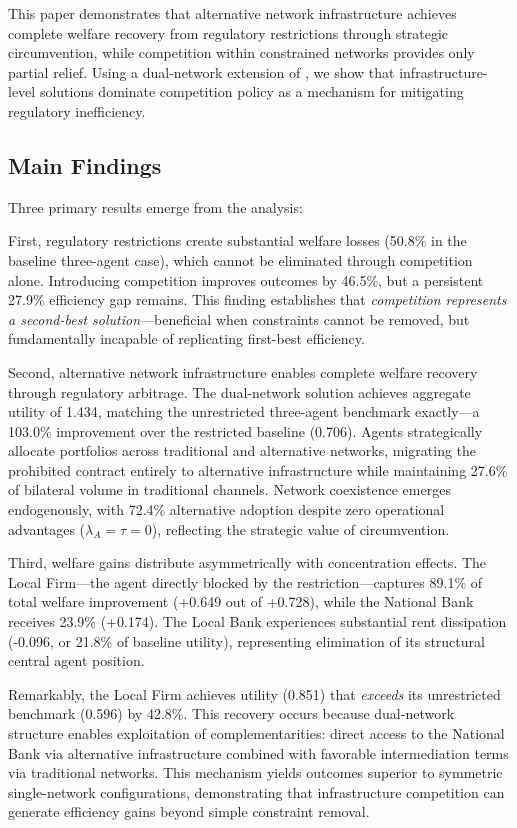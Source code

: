 \documentclass[12pt]{article}
\begin{document}
This paper demonstrates that alternative network infrastructure achieves complete welfare recovery from regulatory restrictions through strategic circumvention, while competition within constrained networks provides only partial relief. Using a dual-network extension of \citet{jalan_incentive-aware_2024}, we show that infrastructure-level solutions dominate competition policy as a mechanism for mitigating regulatory inefficiency.

\subsection{Main Findings}

Three primary results emerge from the analysis:

First, regulatory restrictions create substantial welfare losses (50.8\% in the baseline three-agent case), which cannot be eliminated through competition alone. Introducing competition improves outcomes by 46.5\%, but a persistent 27.9\% efficiency gap remains. This finding establishes that \textit{competition represents a second-best solution}---beneficial when constraints cannot be removed, but fundamentally incapable of replicating first-best efficiency.

Second, alternative network infrastructure enables complete welfare recovery through regulatory arbitrage. The dual-network solution achieves aggregate utility of 1.434, matching the unrestricted three-agent benchmark exactly---a 103.0\% improvement over the restricted baseline (0.706). Agents strategically allocate portfolios across traditional and alternative networks, migrating the prohibited contract entirely to alternative infrastructure while maintaining 27.6\% of bilateral volume in traditional channels. Network coexistence emerges endogenously, with 72.4\% alternative adoption despite zero operational advantages ($\lambda_A = \tau = 0$), reflecting the strategic value of circumvention.

Third, welfare gains distribute asymmetrically with concentration effects. The Local Firm---the agent directly blocked by the restriction---captures 89.1\% of total welfare improvement (+0.649 out of +0.728), while the National Bank receives 23.9\% (+0.174). The Local Bank experiences substantial rent dissipation (-0.096, or 21.8\% of baseline utility), representing elimination of its structural central agent position. 

Remarkably, the Local Firm achieves utility (0.851) that \textit{exceeds} its unrestricted benchmark (0.596) by 42.8\%. This recovery occurs because dual-network structure enables exploitation of complementarities: direct access to the National Bank via alternative infrastructure combined with favorable intermediation terms via traditional networks. This mechanism yields outcomes superior to symmetric single-network configurations, demonstrating that infrastructure competition can generate efficiency gains beyond simple constraint removal.
\end{document}

